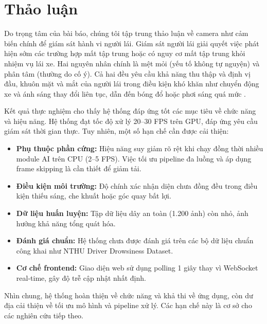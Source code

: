 \section{Thảo luận}

Do trọng tâm của bài báo, chúng tôi tập trung thảo luận về camera như cảm biến chính để giám sát hành vi người lái. Giám sát người lái giải quyết việc phát hiện sớm các trường hợp mất tập trung hoặc có nguy cơ mất tập trung khỏi nhiệm vụ lái xe. Hai nguyên nhân chính là mệt mỏi (yếu tố không tự nguyện) và phân tâm (thường do cố ý). Cả hai đều yêu cầu khả năng thu thập và định vị đầu, khuôn mặt và mắt của người lái trong điều kiện khó khăn như chuyển động xe và ánh sáng thay đổi liên tục, dẫn đến bóng đổ hoặc phơi sáng quá mức \cite{voulodimos2018, lecun2015}.

Kết quả thực nghiệm cho thấy hệ thống đáp ứng tốt các mục tiêu về chức năng và hiệu năng. Hệ thống đạt tốc độ xử lý 20--30 FPS trên GPU, đáp ứng yêu cầu giám sát thời gian thực. Tuy nhiên, một số hạn chế cần được cải thiện:

\begin{itemize}[leftmargin=*,nosep]
  \item \textbf{Phụ thuộc phần cứng:} Hiệu năng suy giảm rõ rệt khi chạy đồng thời nhiều module AI trên CPU (2--5 FPS). Việc tối ưu pipeline đa luồng và áp dụng frame skipping là cần thiết để giảm tải.
  \item \textbf{Điều kiện môi trường:} Độ chính xác nhận diện chưa đồng đều trong điều kiện thiếu sáng, che khuất hoặc góc quay bất lợi.
  \item \textbf{Dữ liệu huấn luyện:} Tập dữ liệu dây an toàn (1.200 ảnh) còn nhỏ, ảnh hưởng khả năng tổng quát hóa.
  \item \textbf{Đánh giá chuẩn:} Hệ thống chưa được đánh giá trên các bộ dữ liệu chuẩn công khai như NTHU Driver Drowsiness Dataset.
  \item \textbf{Cơ chế frontend:} Giao diện web sử dụng polling 1 giây thay vì WebSocket real-time, gây độ trễ cập nhật nhất định.
\end{itemize}

Nhìn chung, hệ thống hoàn thiện về chức năng và khả thi về ứng dụng, còn dư địa cải thiện về tối ưu mô hình và pipeline xử lý. Các hạn chế này là cơ sở cho các nghiên cứu tiếp theo.
